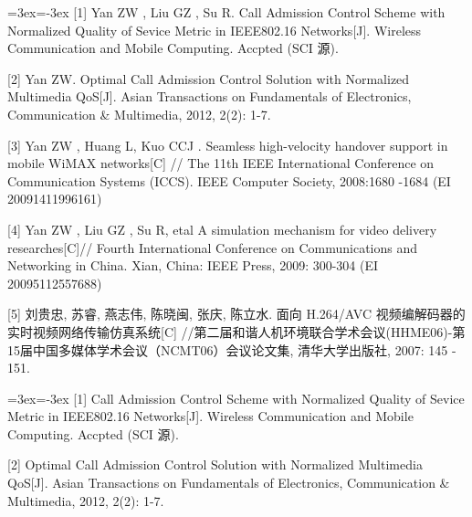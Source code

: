 \documentclass[
    doctor,
    truefont,
    pdflinks,
    ]{xjtuthesis}
\def\authornames{\BlindPeerReviewOFF}
\def\swithON{\BlindPeerReviewOFF}
\def\authornames{\BlindPeerReview}
\def\swithON{\BlindPeerReviewON}
\begin{document}
\begin{spacing}{1.2}
\ifx\authornames\swithON
{\wuhao \leftskip=3ex\parindent=-3ex
[1] Yan  ZW , Liu GZ , Su R. Call Admission Control Scheme with Normalized Quality of Sevice Metric in IEEE802.16 Networks[J].  Wireless Communication and Mobile Computing.  Accpted (SCI 源).

[2] Yan ZW. Optimal Call Admission Control Solution with Normalized Multimedia QoS[J]. Asian Transactions on Fundamentals of Electronics, Communication \& Multimedia, 2012, 2(2): 1-7.


[3] Yan ZW ,  Huang L, Kuo CCJ .   Seamless high-velocity handover support in mobile WiMAX networks[C] //  The 11th IEEE  International Conference on Communication Systems (ICCS).  IEEE Computer Society, 2008:1680 -1684 (EI 20091411996161)

[4] Yan  ZW , Liu GZ , Su R, etal  A simulation
mechanism for video delivery researches[C]// Fourth International Conference on Communications and Networking in China. Xian, China: IEEE Press, 2009: 300-304 (EI 20095112557688)

[5] 刘贵忠, 苏睿, 燕志伟, 陈晓闽, 张庆, 陈立水.  面向 H.264/AVC 视频编解码器的实时视频网络传输仿真系统[C] //第二届和谐人机环境联合学术会议(HHME06)-第15届中国多媒体学术会议（NCMT06）会议论文集, 清华大学出版社, 2007: 145 - 151.

}
\else
{\wuhao \leftskip=3ex\parindent=-3ex
[1] Call Admission Control Scheme with Normalized Quality of Sevice Metric in IEEE802.16 Networks[J].  Wireless Communication and Mobile Computing.  Accpted (SCI 源).

[2] Optimal Call Admission Control Solution with Normalized Multimedia QoS[J]. Asian Transactions on Fundamentals of Electronics, Communication \& Multimedia, 2012, 2(2): 1-7.


}
\end{spacing}
\end{document}
